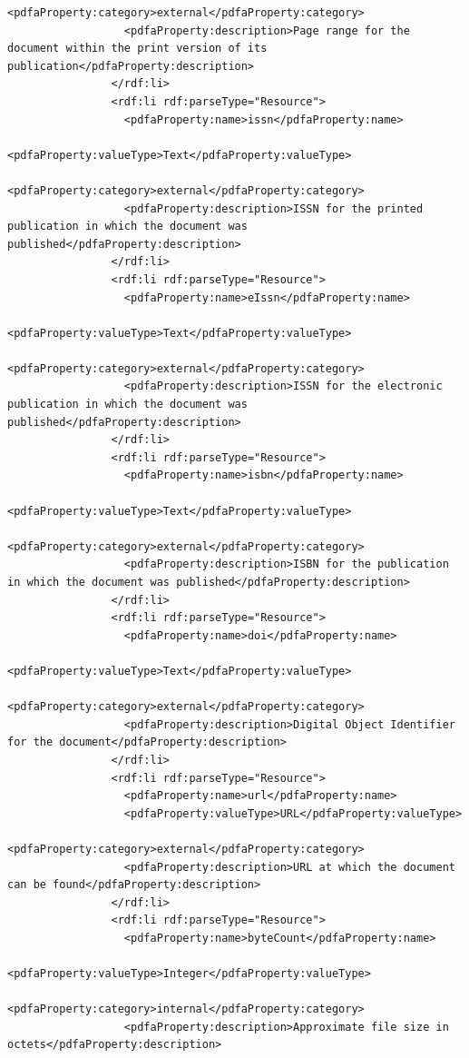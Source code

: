 \begin{lstlisting}[style=myXML,
caption={Second part of the XML metadata embedded in a PDF file (some reformatting has been done to fit the text in the boarders)}, label={lst:pdfinfoOutputPart2}]
                  <pdfaProperty:category>external</pdfaProperty:category>
                  <pdfaProperty:description>Page range for the document within the print version of its publication</pdfaProperty:description>
                </rdf:li>
                <rdf:li rdf:parseType="Resource">
                  <pdfaProperty:name>issn</pdfaProperty:name>
                  <pdfaProperty:valueType>Text</pdfaProperty:valueType>
                  <pdfaProperty:category>external</pdfaProperty:category>
                  <pdfaProperty:description>ISSN for the printed publication in which the document was published</pdfaProperty:description>
                </rdf:li>
                <rdf:li rdf:parseType="Resource">
                  <pdfaProperty:name>eIssn</pdfaProperty:name>
                  <pdfaProperty:valueType>Text</pdfaProperty:valueType>
                  <pdfaProperty:category>external</pdfaProperty:category>
                  <pdfaProperty:description>ISSN for the electronic publication in which the document was published</pdfaProperty:description>
                </rdf:li>
                <rdf:li rdf:parseType="Resource">
                  <pdfaProperty:name>isbn</pdfaProperty:name>
                  <pdfaProperty:valueType>Text</pdfaProperty:valueType>
                  <pdfaProperty:category>external</pdfaProperty:category>
                  <pdfaProperty:description>ISBN for the publication in which the document was published</pdfaProperty:description>
                </rdf:li>
                <rdf:li rdf:parseType="Resource">
                  <pdfaProperty:name>doi</pdfaProperty:name>
                  <pdfaProperty:valueType>Text</pdfaProperty:valueType>
                  <pdfaProperty:category>external</pdfaProperty:category>
                  <pdfaProperty:description>Digital Object Identifier for the document</pdfaProperty:description>
                </rdf:li>
                <rdf:li rdf:parseType="Resource">
                  <pdfaProperty:name>url</pdfaProperty:name>
                  <pdfaProperty:valueType>URL</pdfaProperty:valueType>
                  <pdfaProperty:category>external</pdfaProperty:category>
                  <pdfaProperty:description>URL at which the document can be found</pdfaProperty:description>
                </rdf:li>
                <rdf:li rdf:parseType="Resource">
                  <pdfaProperty:name>byteCount</pdfaProperty:name>
                  <pdfaProperty:valueType>Integer</pdfaProperty:valueType>
                  <pdfaProperty:category>internal</pdfaProperty:category>
                  <pdfaProperty:description>Approximate file size in octets</pdfaProperty:description>

\end{lstlisting}
